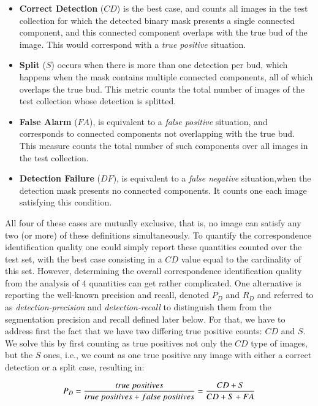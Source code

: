 \documentclass[a4paper,authoryear,review]{elsarticle}
\begin{document}
\begin{itemize}
\item \textbf{Correct Detection} ($CD$) is the best case, and counts all images in the test collection for which the detected binary mask presents a single connected component, and this connected component overlaps with the true bud of the image. This would correspond with a \emph{true positive} situation.
\item \textbf{Split} ($S$) occurs when there is more than one detection per bud, which happens  when the mask contains multiple connected components, all of which overlaps the true bud. This metric counts the total number of images of the test collection whose detection is splitted.
\item \textbf{False Alarm} ($FA$), is equivalent to a \emph{false positive} situation, and corresponds to connected components not overlapping with the true bud. This measure counts the total number of such components over all images in the test collection.
\item \textbf{Detection Failure} ($DF$), is equivalent to a \emph{false negative} situation,when the detection mask presents no connected components. It counts one each image satisfying this condition.
\end{itemize}

All four of these cases are mutually exclusive, that is, no image can satisfy any two (or more) of these definitions simultaneously. To quantify the correspondence identification quality one could simply report these quantities counted over the test set, with the best case consisting in a $CD$ value equal to the cardinality of this set. However, determining the overall correspondence identification quality from the analysis of $4$ quantities can get rather complicated. 
%
One alternative is reporting the well-known precision and recall, denoted $P_D$ and $R_D$ and referred to as  \emph{detection-precision} and \emph{detection-recall} to distinguish them from the segmentation precision and recall defined later below. For that, we have to address first the fact that  we have two differing true positive counts: $CD$ and $S$. We solve this by first counting as true positives not only the $CD$ type of images, but the $S$ ones, i.e., we count as one true positive any image with either a correct detection or a split case, resulting in:

\begin{equation}
    P_D = \frac{true\ positives}{true\ positives+false\ positives} \\
= \frac{CD+S}{CD+S+FA}
    \label{eq:detection-precision}
\end{equation}
\end{document}
